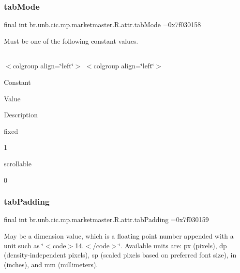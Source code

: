 \subsubsection{\texorpdfstring{tab\+Mode}{tabMode}}
{\footnotesize\ttfamily final int br.\+unb.\+cic.\+mp.\+marketmaster.\+R.\+attr.\+tab\+Mode =0x7f030158\hspace{0.3cm}{\ttfamily [static]}}

Must be one of the following constant values.

\tabulinesep=1mm
\begin{longtabu} spread 0pt [c]{*{0}{|X[-1]}|}
\hline
\end{longtabu}
$<$colgroup align=\char`\"{}left\char`\"{}$>$ $<$colgroup align=\char`\"{}left\char`\"{}$>$ 

Constant

Value

Description 

fixed

1

scrollable

0\mbox{\label{classbr_1_1unb_1_1cic_1_1mp_1_1marketmaster_1_1R_1_1attr_acadb101c98ff5c0215183f1421dcd92b}} 
\subsubsection{\texorpdfstring{tab\+Padding}{tabPadding}}
{\footnotesize\ttfamily final int br.\+unb.\+cic.\+mp.\+marketmaster.\+R.\+attr.\+tab\+Padding =0x7f030159\hspace{0.3cm}{\ttfamily [static]}}

May be a dimension value, which is a floating point number appended with a unit such as \char`\"{}$<$code$>$14.\+5sp$<$/code$>$\char`\"{}. Available units are\+: px (pixels), dp (density-\/independent pixels), sp (scaled pixels based on preferred font size), in (inches), and mm (millimeters). \mbox{\label{classbr_1_1unb_1_1cic_1_1mp_1_1marketmaster_1_1R_1_1attr_a55a1209f93e9b3ffa88070350aa4cb10}} 
